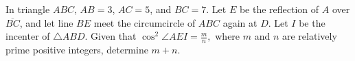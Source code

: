 In triangle $ABC$, $AB=3$, $AC=5$, and $BC=7$. Let $E$ be the reflection of $A$ over $\overline{BC}$, and let line $BE$ meet the circumcircle of $ABC$ again at $D$. Let $I$ be the incenter of $\triangle ABD$. Given that $\cos ^2  \angle AEI = \frac{m}{n},$ where $m$ and $n$ are relatively prime positive integers, determine $m+n$.
